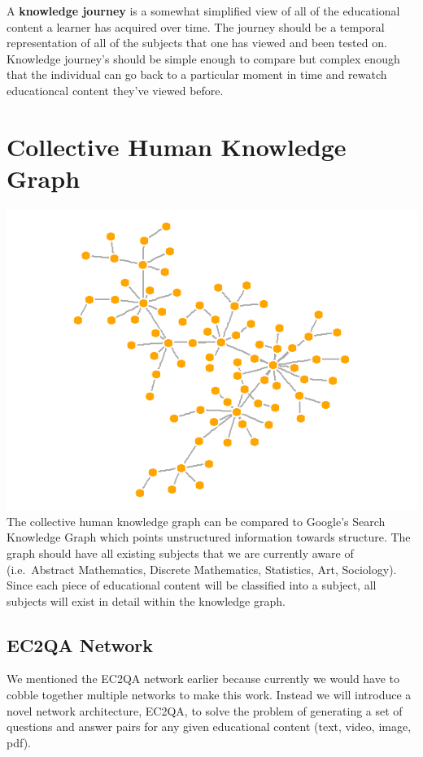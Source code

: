 \documentclass[]{book}
\theoremstyle{definition}
\theoremstyle{definition}
\theoremstyle{definition}
\theoremstyle{remark}
\begin{document}
A \textbf{knowledge journey} is a somewhat simplified view of all of the
educational content a learner has acquired over time. The journey should
be a temporal representation of all of the subjects that one has viewed
and been tested on. Knowledge journey's should be simple enough to
compare but complex enough that the individual can go back to a
particular moment in time and rewatch educationcal content they've
viewed before.

\section{Collective Human Knowledge
Graph}\label{collective-human-knowledge-graph}

\includegraphics{img/knowledge_graphy.png} The collective human
knowledge graph can be compared to Google's Search Knowledge Graph which
points unstructured information towards structure. The graph should have
all existing subjects that we are currently aware of (i.e.~Abstract
Mathematics, Discrete Mathematics, Statistics, Art, Sociology). Since
each piece of educational content will be classified into a subject, all
subjects will exist in detail within the knowledge graph.

\subsection{EC2QA Network}\label{ec2qa-network}

We mentioned the EC2QA network earlier because currently we would have
to cobble together multiple networks to make this work. Instead we will
introduce a novel network architecture, EC2QA, to solve the problem of
generating a set of questions and answer pairs for any given educational
content (text, video, image, pdf).
\end{document}
